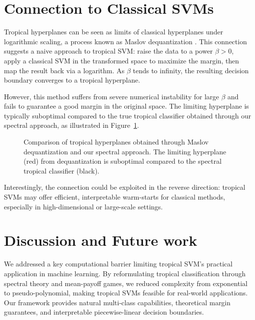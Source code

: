 \documentclass{article}
\begin{document}
\newpage
\section{Connection to Classical SVMs}\label{sec:maslov}
Tropical hyperplanes can be seen as limits of classical hyperplanes under logarithmic scaling, a process known as Maslov dequantization \cite{viro2001}. This connection suggests a naive approach to tropical SVM: raise the data to a power $\beta > 0$, apply a classical SVM in the transformed space to maximize the margin, then map the result back via a logarithm. As $\beta$ tends to infinity, the resulting decision boundary converges to a tropical hyperplane.

However, this method suffers from severe numerical instability for large $\beta$ and fails to guarantee a good margin in the original space. The limiting hyperplane is typically suboptimal compared to the true tropical classifier obtained through our spectral approach, as illustrated in Figure~\ref{fig:maslov_dequantization}.

\begin{figure}[h]
    \centering
    \resizebox{0.5\textwidth}{!}{\clipbox{0.15\width{} 0.15\height{} 0.15\width{} 0.15\height{}}{}}
    \caption{Comparison of tropical hyperplanes obtained through Maslov dequantization and our spectral approach. The limiting hyperplane (red) from dequantization is suboptimal compared to the spectral tropical classifier (black).}
    \label{fig:maslov_dequantization}
\end{figure}

Interestingly, the connection could be exploited in the reverse direction: tropical SVMs may offer efficient, interpretable warm-starts for classical methods, especially in high-dimensional or large-scale settings.

\section{Discussion and Future work}\label{sec:discussion}

We addressed a key computational barrier limiting tropical SVM's practical application in machine learning. By reformulating tropical classification through spectral theory and mean-payoff games, we reduced complexity from exponential to pseudo-polynomial, making tropical SVMs feasible for real-world applications. Our framework provides natural multi-class capabilities, theoretical margin guarantees, and interpretable piecewise-linear decision boundaries.
\end{document}
